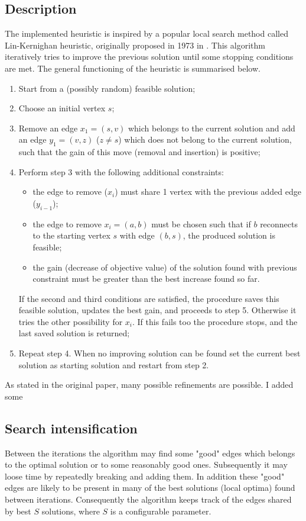\subsection{Description}
The implemented heuristic is inspired by a popular local search method called Lin-Kernighan heuristic, originally proposed in 1973 in \cite{LinK73}. This algorithm iteratively tries to improve the previous solution until some stopping conditions are met. The general functioning of the heuristic is summarised below.
\begin{enumerate}
	\item Start from a (possibly random) feasible solution;
	\item Choose an initial vertex $s$;
	\item Remove an edge $x_1 = (s, v)$ which belongs to the current solution and add an edge $y_1 = (v, z)$ ($z \ne s$) which does not belong to the current solution, such that the gain of this move (removal and insertion) is positive;
	\item Perform step 3 with the following additional constraints:
	\begin{itemize}
		\item the edge to remove ($x_i$) must share 1 vertex with the previous added edge ($y_{i-1}$);
		\item the edge to remove $x_i = (a, b)$ must be chosen such that if $b$ reconnects to the starting vertex $s$ with edge $(b, s)$, the produced solution is feasible;
		\item the gain (decrease of objective value) of the solution found with previous constraint must be greater than the best increase found so far.
	\end{itemize}
	If the second and third conditions are satisfied, the procedure saves this feasible solution, updates the best gain, and proceeds to step 5. Otherwise it tries the other possibility for $x_i$. If this fails too the procedure stops, and the last saved solution is returned;
	\item Repeat step 4. When no improving solution can be found set the current best solution as starting solution and restart from step 2.
\end{enumerate}

As stated in the original paper, many possible refinements are possible. I added some 

\subsection{Search intensification}
Between the iterations the algorithm may find some "good" edges which belongs to the optimal solution or to some reasonably good ones. Subsequently it may loose time by repeatedly breaking and adding them. In addition these "good" edges are likely to be present in many of the best solutions (local optima) found between iterations. Consequently the algorithm keeps track of the edges shared by best $S$ solutions, where $S$ is a configurable parameter.

